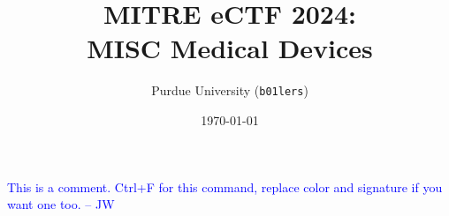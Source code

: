 \documentclass{article}
\title{MITRE eCTF 2024:\\MISC Medical Devices}
\author{Purdue University (\texttt{b01lers})}
\date{\today}
\newif\iflong
\newcommand{\jw}[1]{\textcolor{blue}{#1}}
\begin{document}
\maketitle

\jw{This is a comment. Ctrl+F for this command, replace color and signature if you want one too. -- JW}










\iflong

\fi


\newpage


\end{document}
